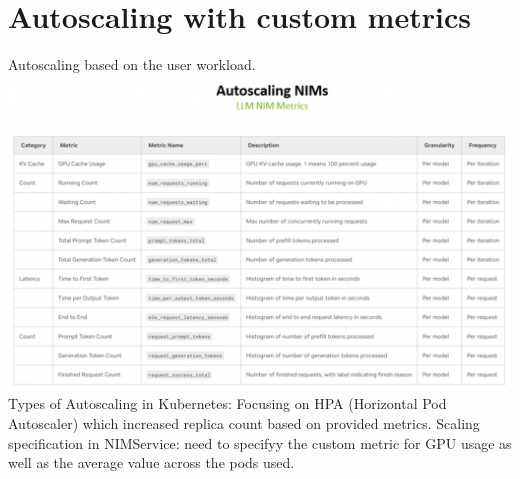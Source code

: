 \documentclass{article}
\begin{document}
\section{Autoscaling with custom metrics}
Autoscaling based on the user workload. \\\includegraphics[width=\textwidth]{../images/typesOfmetrics.png}\\
Types of Autoscaling in Kubernetes: 
Focusing on HPA (Horizontal Pod Autoscaler) which increased replica count based on provided metrics. 
Scaling specification in NIMService: need to specifyy the custom metric for GPU usage as well as the average value across the pods used. 
\end{document}
